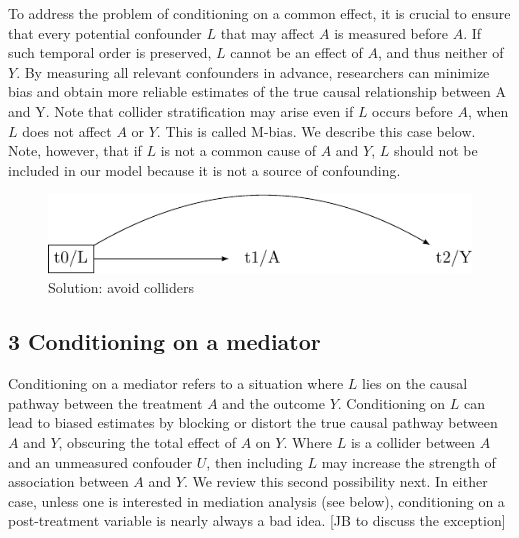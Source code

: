 \documentclass[
  singlecolumn]{report}
\begin{document}
To address the problem of conditioning on a common effect, it is crucial
to ensure that every potential confounder \(L\) that may affect \(A\) is
measured before \(A\). If such temporal order is preserved, \(L\) cannot
be an effect of \(A\), and thus neither of \(Y\). By measuring all
relevant confounders in advance, researchers can minimize bias and
obtain more reliable estimates of the true causal relationship between A
and Y. Note that collider stratification may arise even if \(L\) occurs
before \(A\), when \(L\) does not affect \(A\) or \(Y\). This is called
M-bias. We describe this case below. Note, however, that if \(L\) is not
a common cause of \(A\) and \(Y\), \(L\) should not be included in our
model because it is not a source of confounding.

\begin{figure}

{\centering \includegraphics[width=1\textwidth,height=\textheight]{causal-dags_files/figure-pdf/fig-dag-common-effect-solution-1.pdf}

}

\caption{\label{fig-dag-common-effect-solution}Solution: avoid
colliders}

\end{figure}

\hypertarget{conditioning-on-a-mediator}{%
\subsection{3 Conditioning on a
mediator}\label{conditioning-on-a-mediator}}

Conditioning on a mediator refers to a situation where \(L\) lies on the
causal pathway between the treatment \(A\) and the outcome \(Y\).
Conditioning on \(L\) can lead to biased estimates by blocking or
distort the true causal pathway between \(A\) and \(Y\), obscuring the
total effect of \(A\) on \(Y\). Where \(L\) is a collider between \(A\)
and an unmeasured confouder \(U\), then including \(L\) may increase the
strength of association between \(A\) and \(Y\). We review this second
possibility next. In either case, unless one is interested in mediation
analysis (see below), conditioning on a post-treatment variable is
nearly always a bad idea. {[}JB to discuss the exception{]}
\end{document}
